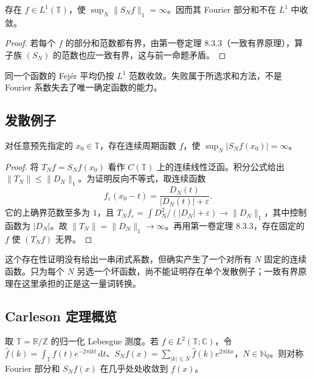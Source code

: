 \begin{corollary}\label{b2:cor:02-l1-failure}
存在 \(f\in L^1(\mathbb T)\)，使 \(\sup_N\|S_Nf\|_1=\infty\)。因而其 Fourier 部分和不在 \(L^1\) 中收敛。
\end{corollary}
\begin{proof}
若每个 \(f\) 的部分和范数都有界，由第一卷定理 8.3.3（一致有界原理），算子族 \((S_N)\) 的范数也应一致有界，这与前一命题矛盾。
\end{proof}

同一个函数的 Fejér 平均仍按 \(L^1\) 范数收敛。失败属于所选求和方法，不是 Fourier 系数失去了唯一确定函数的能力。

\subsection{发散例子}
\label{b2:subsec:020703}

\begin{proposition}\label{b2:prop:02-continuous-divergence}
对任意预先指定的 \(x_0\in\mathbb T\)，存在连续周期函数 \(f\)，使 \(\sup_N|S_Nf(x_0)|=\infty\)。
\end{proposition}
\begin{proof}
将 \(T_Nf=S_Nf(x_0)\) 看作 \(C(\mathbb T)\) 上的连续线性泛函。积分公式给出 \(\|T_N\|\leq\|D_N\|_1\)。为证明反向不等式，取连续函数
\[
 f_\varepsilon(x_0-t)=\dfrac{D_N(t)}{|D_N(t)|+\varepsilon}.
\]
它的上确界范数至多为 \(1\)，且 \(T_Nf_\varepsilon=\int D_N^2/(|D_N|+\varepsilon)\to\|D_N\|_1\)，其中控制函数为 \(|D_N|\)。故 \(\|T_N\|=\|D_N\|_1\to\infty\)。再用第一卷定理 8.3.3，存在固定的 \(f\) 使 \((T_Nf)\) 无界。
\end{proof}

这个存在性证明没有给出一串闭式系数，但确实产生了一个对所有 \(N\) 固定的连续函数。只为每个 \(N\) 另选一个坏函数，尚不能证明存在单个发散例子；一致有界原理在这里承担的正是这一量词转换。

\subsection{Carleson 定理概览}
\label{b2:subsec:020704}

\begin{claim}\label{b2:claim:02-carleson}
取 \(\mathbb T=\mathbb R/\mathbb Z\) 的归一化 Lebesgue 测度。若 \(f\in L^2(\mathbb T;\mathbb C)\)，令 \(\widehat f(k)=\int_{\mathbb T}f(t)e^{-2\pi\mathrm i kt}\,\mathrm dt\)、\(S_Nf(x)=\sum_{|k|\le N}\widehat f(k)e^{2\pi\mathrm i kx}\)，\(N\in\mathbb N_0\)。则对称 Fourier 部分和 \(S_Nf(x)\) 在几乎处处收敛到 \(f(x)\)。
\end{claim}

